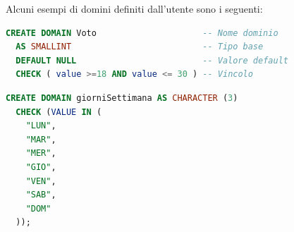 \documentclass[a4paper,twoside]{article}
\begin{document}
\begin{example}
  Alcuni esempi di domini definiti dall'utente sono i seguenti:

\begin{lstlisting}[language=SQL]
CREATE DOMAIN Voto                     -- Nome dominio
  AS SMALLINT                          -- Tipo base
  DEFAULT NULL                         -- Valore default
  CHECK ( value >=18 AND value <= 30 ) -- Vincolo
\end{lstlisting}

\begin{lstlisting}[language=SQL]
CREATE DOMAIN giorniSettimana AS CHARACTER (3)
  CHECK (VALUE IN (
    "LUN",
    "MAR",
    "MER",
    "GIO",
    "VEN",
    "SAB",
    "DOM"
  ));
\end{lstlisting}
\vspace{1em}
\noindent

\end{example}
\end{document}
